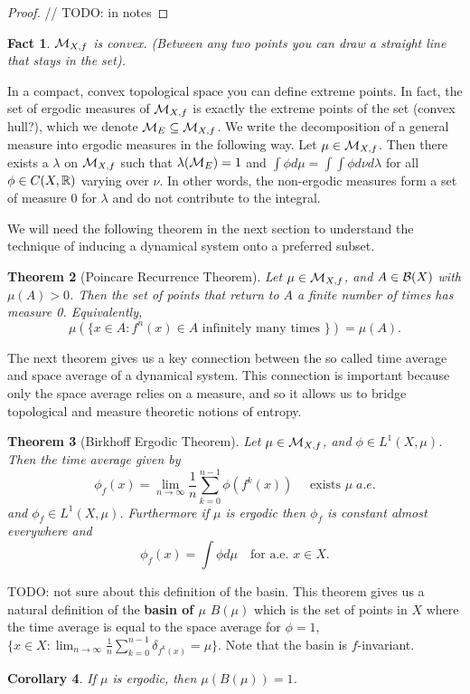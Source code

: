 \documentclass[11pt, reqno]{amsart}
\theoremstyle{plain}
\newtheorem{thm}{Theorem}[section]
\numberwithin{thm}{subsection}
\newtheorem{cor}[thm]{Corollary}
\newtheorem{fact}[thm]{Fact}
\theoremstyle{definition}
\begin{document}
\begin{proof}
  // TODO: in notes
\end{proof}

\begin{fact}
  $\mathcal{M}_{X,f}$ is convex. (Between any two points you can draw a straight line that stays in the set).
\end{fact}

In a compact, convex topological space you can define extreme points. In fact, the set of ergodic measures of $\mathcal{M}_{X,f}$ is exactly the extreme points of the set (convex hull?), which we denote $\mathcal{M}_E \subseteq \mathcal{M}_{X,f}$. We write the decomposition of a general measure into ergodic measures in the following way. Let $\mu \in \mathcal{M}_{X,f}$. Then there exists a $\lambda$ on $\mathcal{M}_{X,f}$ such that $\lambda(\mathcal{M}_E) = 1$ and $\int \phi d\mu = \int \int \phi d\nu d\lambda$ for all $\phi \in C(X, \mathbb{R})$ varying over $\nu$. In other words, the non-ergodic measures form a set of measure 0 for $\lambda$ and do not contribute to the integral.

We will need the following theorem in the next section to understand the technique of inducing a dynamical system onto a preferred subset.
\begin{thm}[Poincare Recurrence Theorem]
  Let $\mu \in \mathcal{M}_{X,f}$, and $A \in \mathcal{B}(X)$ with $\mu(A) > 0$. Then the set of points that return to $A$ a finite number of times has measure 0. Equivalently, 
  $$\mu(\{x \in A : f^n(x) \in A \text{ infinitely many times }\}) = \mu(A).$$
\end{thm}

The next theorem gives us a key connection between the so called time average and space average of a dynamical system. This connection is important because only the space average relies on a measure, and so it allows us to bridge topological and measure theoretic notions of entropy.
\begin{thm}[Birkhoff Ergodic Theorem]
  Let $\mu \in \mathcal{M}_{X,f}$, and $\phi \in L^1(X,\mu)$. Then the time average given by 
  $$\phi_f(x) = \lim_{n \rightarrow \infty} \frac{1}{n}\sum_{k=0}^{n-1} \phi(f^k(x))\quad\text{ exists }\mu\;a.e.$$
  and $\phi_f \in L^1(X,\mu)$. Furthermore if $\mu$ is ergodic then $\phi_f$ is constant almost everywhere and 
  $$\phi_f(x) = \int \phi d\mu \quad \text{for a.e. }x \in X.$$
\end{thm}

TODO: not sure about this definition of the basin. This theorem gives us a natural definition of the \textbf{basin of $\mu$} $B(\mu)$ which is the set of points in $X$ where the time average is equal to the space average for $\phi = 1$, $\{x \in X : \lim_{n\rightarrow \infty} \frac{1}{n}\sum_{k=0}^{n-1}\delta_{f^k(x)} = \mu\}$. Note that the basin is $f$-invariant.
\begin{cor}
  If $\mu$ is ergodic, then $\mu(B(\mu)) = 1$.
\end{cor}
\end{document}
